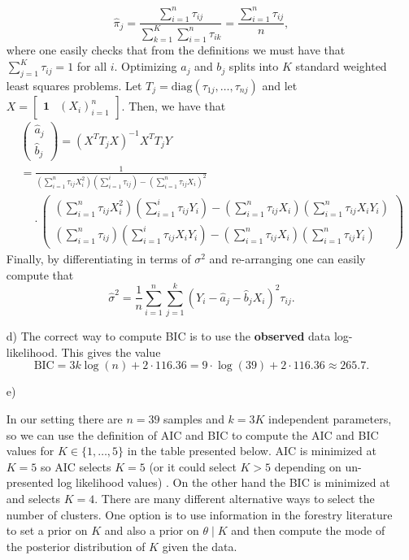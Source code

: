 \begin{enumerate}
\[
\hat{\pi}_j = \frac{ \sum_{i=1}^n \tau_{ij}}{\sum_{k=1}^K \sum_{i=1}^n \tau_{ik}} = \frac{ \sum_{i=1}^n \tau_{ij}}{n},
\]
where one easily checks that from the definitions we must have that $\sum_{j=1}^K \tau_{ij} = 1$ for all $i$. Optimizing $a_j$ and $b_j$ splits into $K$ standard weighted least squares problems. Let $T_j = \text{diag}(\tau_{1j},\dots,\tau_{nj})$ and let $X= \begin{bmatrix} \mathbf{1} & (X_i)_{i=1}^n \end{bmatrix}$. Then, we have that 
\begin{align*}
& \left( \begin{matrix}
 \hat{a}_j \\ \hat{b}_j
\end{matrix} \right) = (X^TT_jX)^{-1} X^TT_jY\\
& = \frac{1}{(\sum_{i=1}^n \tau_{ij} X_i^2)(\sum_{i=1}^i \tau_{ij}) - (\sum_{i=1}^n \tau_{ij}X_i)^2}\\
& \ \ \ \ \ \cdot \left( \begin{matrix}
(\sum_{i=1}^n \tau_{ij} X_i^2)(\sum_{i=1}^i \tau_{ij}Y_i) - (\sum_{i=1}^n \tau_{ij}X_i)(\sum_{i=1}^n \tau_{ij}X_iY_i) \\ (\sum_{i=1}^n \tau_{ij})(\sum_{i=1}^i \tau_{ij}X_iY_i) - (\sum_{i=1}^n \tau_{ij}X_i)(\sum_{i=1}^n \tau_{ij}Y_i)
\end{matrix} \right) 
\end{align*}
Finally, by differentiating in terms of $\sigma^2$ and re-arranging one can easily compute that 
\[
\hat{\sigma}^2 = \frac{1}{n} \sum_{i=1}^n \sum_{j=1}^k (Y_i - \hat{a}_j - \hat{b}_jX_i)^2 \tau_{ij}.
\]
\item[d)]
The correct way to compute BIC is to use the \textbf{observed} data log-likelihood. This gives the value
\[
\text{BIC} = 3k\log(n) + 2\cdot 116.36 = 9\cdot\log(39) + 2\cdot 116.36 \approx 265.7.
\]
\item[e)]

In our setting there are $n=39$ samples and $k=3K$ independent parameters, so we can use the definition of AIC and BIC to compute the AIC and BIC values for $K \in \{1,\dots,5 \}$ in the table presented below. AIC is minimized at $K=5$ so AIC selects $K=5$ (or it could select $K>5$ depending on un-presented log likelihood values) . On the other hand the BIC  is minimized at and selects $K=4$. There are many different alternative ways to select the number of clusters. One option is to use information in the forestry literature to set a prior on $K$ and also a prior on $\theta \mid K$ and then compute the mode of the posterior distribution of $K$ given the data. %
\end{enumerate}

